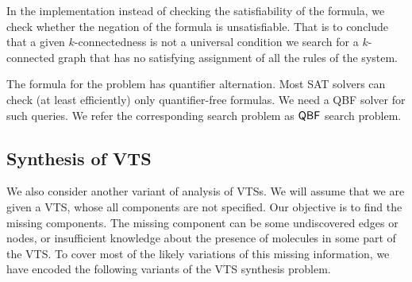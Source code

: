 %
In the implementation instead of checking the satisfiability of the formula, we check whether the negation of the formula is unsatisfiable. That is to conclude that a given $k$-connectedness is not a universal condition we search for a $k$-connected graph that has no satisfying assignment of all the rules of the system.
 
The formula for the problem has quantifier alternation. 
%
Most SAT solvers can check (at least efficiently) only quantifier-free formulas.
%
%
We need a QBF solver for such queries. 
%
We refer the corresponding search problem as $\mathsf{QBF}$ search problem.
%


%

\subsection{Synthesis of VTS}
%
\noindent We also consider another variant of analysis of VTSs.
%
We will assume that we are given a VTS, whose all components
are not specified.
%
Our objective is to find the missing components.
%
The missing component can
%
be some undiscovered edges or nodes, or insufficient
knowledge about the presence of molecules in some part of the VTS.
%
To cover most of the likely variations of this missing information,
we have encoded the following variants of the VTS synthesis problem.

